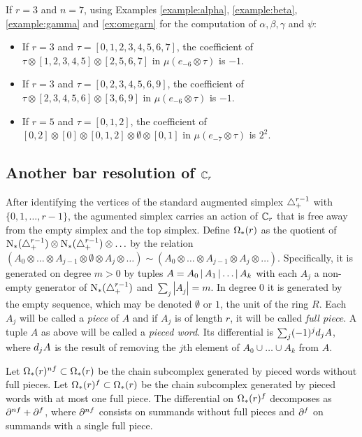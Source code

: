 \begin{example}\label{ex:omegarnfinal} If $r=3$ and $n=7$, using Examples \ref{example:alpha}, \ref{example:beta},  \ref{example:gamma} and \ref{ex:omegarn} for the computation of $\alpha,\beta,\gamma$ and $\psi$:
	\begin{itemize}
		\item If $r = 3$ and $\tau = [0,1,2,3,4,5,6,7]$, the coefficient of $\tau\otimes [1,2,3,4,5]\otimes [2,5,6,7]$ in $\mu(e_{-6}\otimes \tau)$ is $-1$.
		\item If $r = 3$ and $\tau = [0,2,3,4,5,6,9]$, the coefficient of $\tau\otimes [2,3,4,5,6]\otimes [3,6,9]$ in $\mu(e_{-6}\otimes \tau)$ is $-1$.
		\item If $r = 5$ and $\tau = [0,1,2]$, the coefficient of $[0,2]\otimes [0]\otimes [0,1,2]\otimes \emptyset\otimes [0,1]$ in $\mu(e_{-7}\otimes \tau)$ is $2^2$.
	\end{itemize}
\end{example}

\subsection{Another bar resolution of \texorpdfstring{$\mathbb{C}_r$}{the cyclic group}}

After identifying the vertices of the standard augmented simplex $\triangle_{+}^{r-1}$ with $\{0,1,\ldots,r-1\}$, the agumented simplex carries an action of $\mathbb{C}_r$ that is free away from the empty simplex and the top simplex. Define $\operatorname{\Omega}_{*}(r)$ as the quotient of $\operatorname{N}_{*}(\triangle_{+}^{r-1})\otimes \operatorname{N}_{*}(\triangle_{+}^{r-1})\otimes\ldots$ by the relation $(A_0\otimes \ldots \otimes A_{j-1}\otimes \emptyset \otimes A_j\otimes \ldots) \sim (A_0\otimes \ldots \otimes A_{j-1}\otimes A_j \otimes \ldots)$. Specifically, it is generated on degree $m>0$ by tuples $A = A_0\operatorname{|} A_1\operatorname{|}\ldots \operatorname{|} A_k$ with each $A_j$ a non-empty generator of $\operatorname{N}_{*}(\triangle_{+}^{r-1})$ and $\sum_j |A_j| = m$. In degree $0$ it is generated by the empty sequence, which may be denoted $\emptyset$ or $1$, the unit of the ring $R$. Each $A_j$ will be called a \emph{piece} of $A$ and if $A_j$ is of length $r$, it will be called \emph{full piece}. A tuple $A$ as above will be called a \emph{pieced word}. Its differential is $\sum_{j} (-1)^j d_j A$, where $d_jA$ is the result of removing the $j$th element of $A_0\cup \ldots\cup A_k$ from $A$. 

Let $\operatorname{\Omega}_{*}(r)^{nf}\subset \operatorname{\Omega}_{*}(r)$ be the chain subcomplex generated by pieced words without full pieces. Let $\operatorname{\Omega}_{*}(r)^{f}\subset \operatorname{\Omega}_{*}(r)$ be the chain subcomplex generated by pieced words with at most one full piece. The differential on $\operatorname{\Omega}_{*}(r)^{f}$ decomposes as $\partial^{nf}+\partial^{f}$, where $\partial^{nf}$ consists on summands without full pieces and $\partial^{f}$ on summands with a single full piece.

